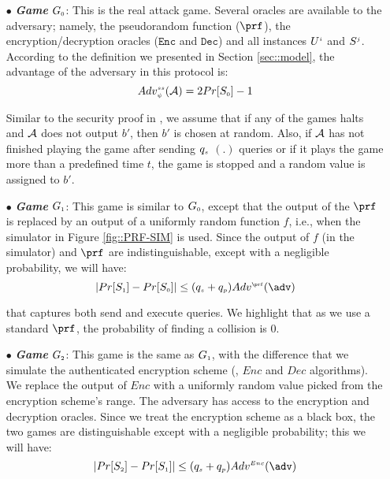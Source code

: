 \begin{itemize}
%
\item[$\bullet$] \textit{\textbf{Game}} $G_{\scriptscriptstyle  0}$: This is the real attack game. Several oracles are  available to the adversary; namely, the pseudorandom function ($\prf$),  the encryption/decryption oracles ($\mathtt{Enc}$ and $\mathtt{Dec}$) and all instances $U^{\scriptscriptstyle  i}$ and $S^{\scriptscriptstyle  j}$.
%
According to the definition we presented in Section \ref{sec::model}, the advantage of the adversary in this protocol is: 
%
\begin{equation}\label{eq::adv-ake-}
Adv_{\scriptscriptstyle  \psi}^{\scriptscriptstyle  ss}(\mathcal{A})=2Pr[S_{\scriptscriptstyle  0}]-1
\end{equation}

Similar to the security proof in \cite{BressonCP03}, we assume that if any of the games halts and $\mathcal{A}$ does not output $b'$, then $b'$  is chosen at random. Also, if $\mathcal{A}$ has not finished playing the game after sending $q_{\scriptscriptstyle  s}$  \send$(.)$ queries or if it plays the game more than a predefined time $t$, the game is stopped and a random value is assigned to $b'$. 
%



\item[$\bullet$] \textit{\textbf{Game}}  $G_{\scriptscriptstyle  1}$: This game is similar to  $G_{\scriptscriptstyle  0}$, except that the output of the $\prf$ is replaced by an output of  a uniformly random function $f$, i.e., when the simulator in Figure \ref{fig::PRF-SIM} is used. Since the output of $f$ (in the simulator) and $\prf$ are indistinguishable, except with a negligible probability, we will have: 
%
\begin{equation}\label{eq::game_1}
|Pr[S_{\sss  1}]-Pr[S_{\sss  0}]|\leq (q_{\sss s}+q_{\sss p})Adv^{\sss\prf}(\adv)
\end{equation}

that captures both send and execute queries. We highlight that as we use a standard $\prf$, the probability of finding a collision is $0$. 



\item[$\bullet$] \textit{\textbf{Game}}  $G_{\scriptscriptstyle  2}$: This game is the same as $G_{\scriptscriptstyle  1}$, with the difference that we simulate the authenticated encryption scheme (\ie, $Enc$ and $Dec$ algorithms). We replace the output of $Enc$ with a uniformly random value picked from the encryption scheme's range. The adversary has access to the encryption and decryption oracles. Since we treat the encryption scheme as a black box, the two games are distinguishable except with a negligible probability; this we will have: 
\begin{equation}\label{eq::game_2}
|Pr[S_{\sss  2}]-Pr[S_{\sss  1}]| \leq (q_{\sss s}+q_{\sss p}) Adv^{\sss Enc}(\adv)
\end{equation}


\end{itemize}
